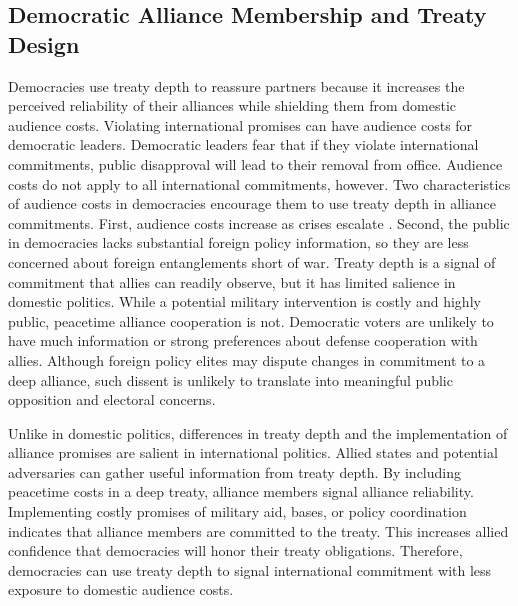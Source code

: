 \documentclass[12pt]{article}
\begin{document}


\subsection{Democratic Alliance Membership and Treaty Design}


Democracies use treaty depth to reassure partners because it increases the perceived reliability of their alliances while shielding them from domestic audience costs. 
Violating international promises can have audience costs for democratic leaders.
Democratic leaders fear that if they violate international commitments, public disapproval will lead to their removal from office.  
Audience costs do not apply to all international commitments, however. 
Two characteristics of audience costs in democracies encourage them to use treaty depth in alliance commitments.  
First, audience costs increase as crises escalate \citep{Tomz2007}. 
Second, the public in democracies lacks substantial foreign policy information, so they are less concerned about foreign entanglements short of war.
Treaty depth is a signal of commitment that allies can readily observe, but it has limited salience in domestic politics. 
While a potential military intervention is costly and highly public, peacetime alliance cooperation is not.  
Democratic voters are unlikely to have much information or strong preferences about defense cooperation with allies. 
Although foreign policy elites may dispute changes in commitment to a deep alliance, such dissent is unlikely to translate 
into meaningful public opposition and electoral concerns.


Unlike in domestic politics, differences in treaty depth and the implementation of alliance promises are salient in international politics. 
Allied states and potential adversaries can gather useful information from treaty depth. 
By including peacetime costs in a deep treaty, alliance members signal alliance reliability. 
Implementing costly promises of military aid, bases, or policy coordination indicates that alliance members are committed to the treaty. 
This increases allied confidence that democracies will honor their treaty obligations. 
Therefore, democracies can use treaty depth to signal international commitment with less exposure to domestic audience costs. 
\end{document}
